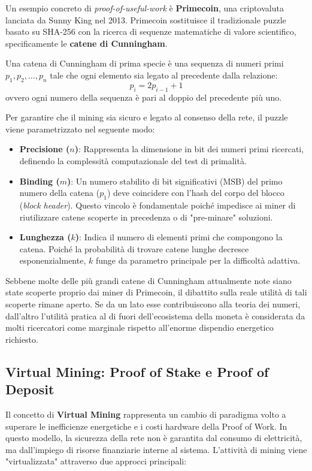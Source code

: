 Un esempio concreto di \textit{proof-of-useful-work} è \textbf{Primecoin}, una criptovaluta lanciata da Sunny King nel 2013. Primecoin sostituisce il tradizionale puzzle basato su SHA-256 con la ricerca di sequenze matematiche di valore scientifico, specificamente le \textbf{catene di Cunningham}.

Una catena di Cunningham di prima specie è una sequenza di numeri primi $p_1, p_2, \dots, p_n$ tale che ogni elemento sia legato al precedente dalla relazione:
\[p_i = 2p_{i-1} + 1\]
ovvero ogni numero della sequenza è pari al doppio del precedente più uno. 

Per garantire che il mining sia sicuro e legato al consenso della rete, il puzzle viene parametrizzato nel seguente modo:
\begin{itemize}
    \item \textbf{Precisione ($n$)}: Rappresenta la dimensione in bit dei numeri primi ricercati, definendo la complessità computazionale del test di primalità.
    \item \textbf{Binding ($m$)}: Un numero stabilito di bit significativi (MSB) del primo numero della catena ($p_1$) deve coincidere con l'hash del corpo del blocco (\textit{block header}). Questo vincolo è fondamentale poiché impedisce ai miner di riutilizzare catene scoperte in precedenza o di "pre-minare" soluzioni.
    \item \textbf{Lunghezza ($k$)}: Indica il numero di elementi primi che compongono la catena. Poiché la probabilità di trovare catene lunghe decresce esponenzialmente, $k$ funge da parametro principale per la difficoltà adattiva.
\end{itemize}

Sebbene molte delle più grandi catene di Cunningham attualmente note siano state scoperte proprio dai miner di Primecoin, il dibattito sulla reale utilità di tali scoperte rimane aperto. Se da un lato esse contribuiscono alla teoria dei numeri, dall'altro l'utilità pratica al di fuori dell'ecosistema della moneta è considerata da molti ricercatori come marginale rispetto all'enorme dispendio energetico richiesto.
\subsection{Virtual Mining: Proof of Stake e Proof of Deposit}
Il concetto di \textbf{Virtual Mining} rappresenta un cambio di paradigma volto a superare le inefficienze energetiche e i costi hardware della Proof of Work. In questo modello, la sicurezza della rete non è garantita dal consumo di elettricità, ma dall'impiego di risorse finanziarie interne al sistema. L'attività di mining viene "virtualizzata" attraverso due approcci principali:

